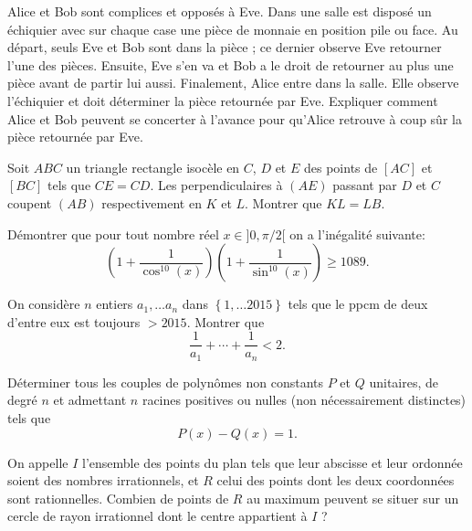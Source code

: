\begin{exo}{}Alice et Bob sont complices et opposés à
Eve. Dans une salle est disposé un échiquier 
avec sur chaque case une pièce de monnaie en position pile ou face.
Au départ, seuls Eve et Bob sont dans la pièce ; ce dernier observe
Eve retourner l'une des pièces. Ensuite, Eve s'en va et Bob a le droit
de retourner au plus une pièce avant de partir lui aussi. Finalement,
Alice entre dans la salle. Elle observe l'échiquier et doit déterminer
la pièce retournée par Eve. Expliquer comment Alice et Bob peuvent
se concerter à l'avance pour qu'Alice retrouve à coup sûr la pièce
retournée par Eve.
\end{exo}


\begin{exo}{}Soit $ABC$ un triangle rectangle isocèle en $C$, $D$ et $E$ des points de $[AC]$ et $[BC]$ tels que $CE=CD$. Les perpendiculaires à $(AE)$ passant par $D$ et $C$ coupent $(AB)$ respectivement en $K$ et $L$. Montrer que $KL=LB$.
\end{exo}


\begin{exo}{}Démontrer que pour tout nombre réel $x \in ]0, \pi/2[$ on a l'inégalité suivante:
$$ \left( 1+ \frac{1}{\cos^{10}(x)} \right)  \left( 1+ \frac{1}{\sin^{10}(x)} \right) \geq 1089.$$
\end{exo}

\begin{exo}{}On considère $n$ entiers $a_{1},\ldots a_{n}$
dans $\left\{ 1,\ldots2015\right\} $ tels que le ppcm de deux d'entre
eux est toujours $>2015$. Montrer que 
\[
\frac{1}{a_{1}}+\cdots+\frac{1}{a_{n}}<2.
\]
\end{exo}

\begin{exo}{}Déterminer tous les couples de polynômes non constants $P$ et $Q$ unitaires, de degré $n$ et admettant $n$ racines positives ou nulles (non nécessairement distinctes) tels que
$$P(x) - Q(x) = 1.$$
\end{exo}

\begin{exo}{}
On appelle $I$ l'ensemble des points du plan tels que leur abscisse et leur ordonnée soient des nombres irrationnels, et $R$ celui des points dont les deux coordonnées sont rationnelles. Combien de points de $R$ au maximum peuvent se situer sur un cercle de rayon irrationnel dont le centre appartient à $I$ ? 
\end{exo}


